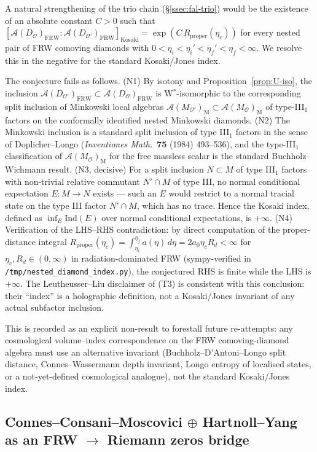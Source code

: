 \documentclass[11pt]{article}
\theoremstyle{definition}
\renewcommand{\AA}{\mathcal{A}}
\newcommand{\OO}{\mathcal{O}}
\newcommand{\FRW}{\mathrm{FRW}}
\newcommand{\Mink}{\mathrm{M}}
\begin{document}
A natural strengthening of the trio chain (\S\ref{ssec:fal-trio}) would be the existence of an absolute constant $C>0$ such that $[\AA(D_\OO)_\FRW : \AA(D_{\OO'})_\FRW]_{\mathrm{Kosaki}} = \exp(C\,R_{\mathrm{proper}}(\eta_c))$ for every nested pair of FRW comoving diamonds with $0<\eta_i<\eta_i'<\eta_f'<\eta_f<\infty$. We resolve this in the negative for the standard Kosaki/Jones index.

The conjecture fails as follows. (N1) By isotony and Proposition~\ref{prop:U-iso}, the inclusion $\AA(D_{\OO'})_\FRW \subset \AA(D_\OO)_\FRW$ is W$^*$-isomorphic to the corresponding split inclusion of Minkowski local algebras $\AA(M_{\OO'})_\Mink \subset \AA(M_\OO)_\Mink$ of type-III$_1$ factors on the conformally identified nested Minkowski diamonds. (N2) The Minkowski inclusion is a standard split inclusion of type III$_1$ factors in the sense of Doplicher--Longo (\emph{Inventiones Math.}\ \textbf{75} (1984) 493--536), and the type-III$_1$ classification of $\AA(M_\OO)_\Mink$ for the free massless scalar is the standard Buchholz--Wichmann result. (N3, decisive) For a split inclusion $N\subset M$ of type III$_1$ factors with non-trivial relative commutant $N'\cap M$ of type III, no normal conditional expectation $E:M\to N$ exists --- such an $E$ would restrict to a normal tracial state on the type III factor $N'\cap M$, which has no trace. Hence the Kosaki index, defined as $\inf_E \mathrm{Ind}(E)$ over normal conditional expectations, is $+\infty$. (N4) Verification of the LHS--RHS contradiction: by direct computation of the proper-distance integral $R_{\mathrm{proper}}(\eta_c) = \int_{\eta_i}^{\eta_f}\!a(\eta)\,d\eta = 2 a_0 \eta_c R_d <\infty$ for $\eta_c, R_d \in(0,\infty)$ in radiation-dominated FRW (sympy-verified in \texttt{/tmp/nested\_diamond\_index.py}), the conjectured RHS is finite while the LHS is $+\infty$. The Leutheusser--Liu disclaimer of (T3) is consistent with this conclusion: their ``index'' is a holographic definition, not a Kosaki/Jones invariant of any actual subfactor inclusion.

This is recorded as an explicit non-result to forestall future re-attempts: any cosmological volume--index correspondence on the FRW comoving-diamond algebra must use an alternative invariant (Buchholz--D'Antoni--Longo split distance, Connes--Wassermann depth invariant, Longo entropy of localised states, or a not-yet-defined cosmological analogue), not the standard Kosaki/Jones index.

\subsection{\texorpdfstring{Connes--Consani--Moscovici $\oplus$ Hartnoll--Yang as an FRW $\to$ Riemann zeros bridge}{Connes-Consani-Moscovici + Hartnoll-Yang as an FRW to Riemann zeros bridge}}\label{ssec:fal-ccm-hy}
\end{document}
